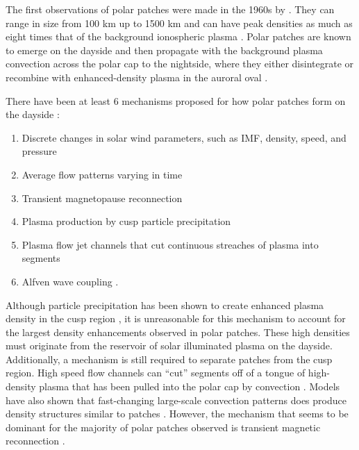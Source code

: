 The first observations of polar patches were made in the 1960s by \citet{Hill1963}.  They can range in size from 100 km up to 1500 km and can have peak densities as much as eight times that of the background ionospheric plasma \citep{Weber1986,Hosokawa2014}.  Polar patches are known to emerge on the dayside and then propagate with the background plasma convection across the polar cap to the nightside, where they either disintegrate or recombine with enhanced-density plasma in the auroral oval \citep{Weber1985,Weber1986}.

There have been at least 6 mechanisms proposed for how polar patches form on the dayside \citep{Crowley1996,Carlson2012}:
\begin{enumerate}
	\item Discrete changes in solar wind parameters, such as IMF, density, speed, and pressure \citep{Sojka1994}
	\item Average flow patterns varying in time \citep{Anderson1988}
	\item Transient magnetopause reconnection \citep{Lockwood1992b}
	\item Plasma production by cusp particle precipitation \citep{Rodger1994,Millward1999}
	\item Plasma flow jet channels that cut continuous streaches of plasma into segments 	\citep{Valladares1998}
	\item Alfven wave coupling \citep{Prikryl1999}.
\end{enumerate}
Although particle precipitation has been shown to create enhanced plasma density in the cusp region \citep{Rodger1994}, it is unreasonable for this mechanism to account for the largest density enhancements observed in polar patches.  These high densities must originate from the reservoir of solar illuminated plasma on the dayside.  Additionally, a mechanism is still required to separate patches from the cusp region.  High speed flow channels can ``cut'' segments off of a tongue of high-density plasma that has been pulled into the polar cap by convection \citep{Valladares1994,Valladares1998}.  Models have also shown that fast-changing large-scale convection patterns does produce density structures similar to patches \citep{Anderson1988}.  However, the mechanism that seems to be dominant for the majority of polar patches observed is transient magnetic reconnection \citep{Carlson2012}.

